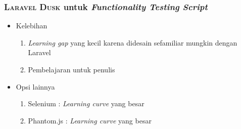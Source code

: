 	\subsubsection{\textsc{Laravel Dusk} untuk \textit{Functionality Testing Script}}
		\begin{itemize}
			\item Kelebihan
			\begin{enumerate}
				\item \textit{Learning gap} yang kecil karena didesain sefamiliar mungkin dengan Laravel
				\item Pembelajaran untuk penulis
			\end{enumerate}
			\item Opsi lainnya
			\begin{enumerate}
				\item Selenium : \textit{Learning curve} yang besar
				\item Phantom.js : \textit{Learning curve} yang besar
			\end{enumerate}
		\end{itemize}
	
	

	
	
	
